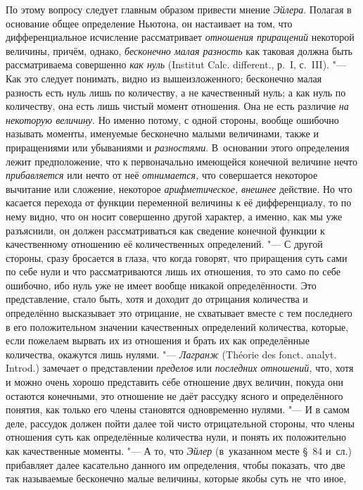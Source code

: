 По этому вопросу следует главным образом привести мнение {\em Эйлера}. Полагая
в основание общее определение Ньютона, он настаивает на том, что
дифференциальное исчисление рассматривает {\em отношения приращений} некоторой
величины, причём, однако, {\em бесконечно малая разность} как таковая должна
быть рассматриваема совершенно {\em как нуль} (Ins\-ti\-tut Calc.
dif\-fe\-rent., р.~I, с.~III). "--- Как это следует понимать, видно из
вышеизложенного; бесконечно малая разность есть нуль лишь по количеству, а не
качественный нуль; а как нуль по количеству, она есть лишь чистый момент
отношения. Она не есть различие {\em на некоторую величину}. Но именно потому,
с одной стороны, вообще ошибочно называть моменты, именуемые бесконечно малыми
величинами, также и приращениями или убываниями и {\em разностями}. В~основании
этого определения лежит предположение, что к первоначально имеющейся конечной
величине нечто {\em прибавляется} или нечто от неё {\em отнимается,} что
совершается некоторое вычитание или сложение, некоторое {\em арифметическое,}
{\em внешнее} действие. Но что касается перехода от функции переменной величины
к её дифференциалу, то по нему видно, что он носит совершенно другой характер,
а именно, как мы уже разъяснили, он должен рассматриваться как сведение
конечной функции к качественному отношению её количественных определений. "---
С другой стороны, сразу бросается в глаза, что когда говорят, что приращения
суть сами по себе нули и что рассматриваются лишь их отношения, то это само по
себе ошибочно, ибо нуль уже не имеет вообще никакой определённости. Это
представление, стало быть, хотя и доходит до отрицания количества и определённо
высказывает это отрицание, не схватывает вместе с тем последнего в его
положительном значении качественных определений количества, которые, если
пожелаем вырвать их из отношения и брать их как определённые количества,
окажутся лишь нулями. "--- {\em Лагранж} (Théorie des fonct. analyt. Introd.)
замечает о представлении {\em пределов} или {\em последних отношений,} что,
хотя и можно очень хорошо представить себе отношение двух величин, покуда они
остаются конечными, это отношение не даёт рассудку ясного и определённого
понятия, как только его члены становятся одновременно нулями. "--- И в самом
деле, рассудок должен пойти далее той чисто отрицательной стороны, что члены
отношения суть как определённые количества нули, и понять их положительно как
качественные моменты. "--- А то, что {\em Эйлер} (в~указанном месте \S~84
и~сл.) прибавляет далее касательно данного им определения, чтобы показать, что
две так называемые бесконечно малые величины, которые якобы суть не~что иное,
